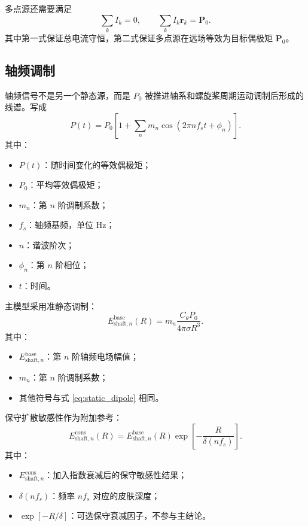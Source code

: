 多点源还需要满足
\begin{equation}
    \sum_k I_k=0,\qquad \sum_k I_k\bm r_k=\bm P_0.
\end{equation}
其中第一式保证总电流守恒，第二式保证多点源在远场等效为目标偶极矩 $\bm P_0$。

\subsection{轴频调制}

轴频信号不是另一个静态源，而是 $P_0$ 被推进轴系和螺旋桨周期运动调制后形成的线谱。写成
\begin{equation}
    P(t)=P_0\left[1+\sum_n m_n\cos(2\pi n f_s t+\phi_n)\right].
    \label{eq:shaft_modulated_P}
\end{equation}
其中：
\begin{itemize}
    \item $P(t)$：随时间变化的等效偶极矩；
    \item $P_0$：平均等效偶极矩；
    \item $m_n$：第 $n$ 阶调制系数；
    \item $f_s$：轴频基频，单位 $\mathrm{Hz}$；
    \item $n$：谐波阶次；
    \item $\phi_n$：第 $n$ 阶相位；
    \item $t$：时间。
\end{itemize}

主模型采用准静态调制：
\begin{equation}
    E_{\mathrm{shaft},n}^{\mathrm{base}}(R)=
    m_n\frac{C_\theta P_0}{4\pi\sigma R^3}.
    \label{eq:shaft_baseline}
\end{equation}
其中：
\begin{itemize}
    \item $E_{\mathrm{shaft},n}^{\mathrm{base}}$：第 $n$ 阶轴频电场幅值；
    \item $m_n$：第 $n$ 阶调制系数；
    \item 其他符号与式 \eqref{eq:static_dipole} 相同。
\end{itemize}

保守扩散敏感性作为附加参考：
\begin{equation}
    E_{\mathrm{shaft},n}^{\mathrm{cons}}(R)=
    E_{\mathrm{shaft},n}^{\mathrm{base}}(R)
    \exp\left[-\frac{R}{\delta(nf_s)}\right].
    \label{eq:shaft_conservative}
\end{equation}
其中：
\begin{itemize}
    \item $E_{\mathrm{shaft},n}^{\mathrm{cons}}$：加入指数衰减后的保守敏感性结果；
    \item $\delta(nf_s)$：频率 $nf_s$ 对应的皮肤深度；
    \item $\exp[-R/\delta]$：可选保守衰减因子，不参与主结论。
\end{itemize}

